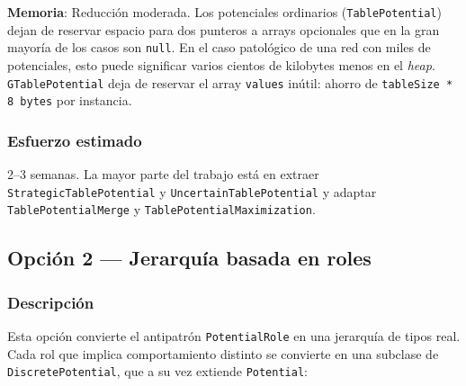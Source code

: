 \documentclass[11pt,a4paper]{article}
\newcommand{\code}[1]{\texttt{#1}}
\begin{document}
\textbf{Memoria}: Reducción moderada.  Los potenciales ordinarios
(\code{TablePotential}) dejan de reservar espacio para dos punteros a arrays
opcionales que en la gran mayoría de los casos son \code{null}.  En el caso
patológico de una red con miles de potenciales, esto puede significar varios
cientos de kilobytes menos en el \emph{heap}.  \code{GTablePotential} deja de
reservar el array \code{values} inútil: ahorro de \code{tableSize * 8 bytes}
por instancia.

\subsubsection*{Esfuerzo estimado}

2--3 semanas.  La mayor parte del trabajo está en extraer \code{StrategicTablePotential}
y \code{UncertainTablePotential} y adaptar \code{TablePotentialMerge} y
\code{TablePotentialMaximization}.

\subsection{Opción 2 --- Jerarquía basada en roles}
\label{sec:op2}

\subsubsection*{Descripción}

Esta opción convierte el antipatrón \code{PotentialRole} en una jerarquía de
tipos real.  Cada rol que implica comportamiento distinto se convierte en una
subclase de \code{DiscretePotential}, que a su vez extiende \code{Potential}:
\end{document}
